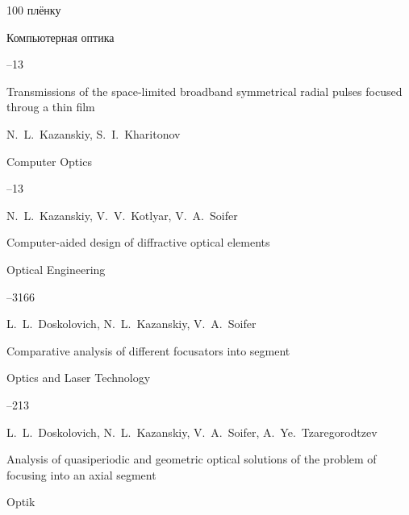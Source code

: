 \begin{thebibliography}{100}
плёнку 

\jour Компьютерная оптика




--13

\misctransl

\paper Transmissions of the space-limited broadband symmetrical radial pulses focused throug a thin film

\by N.~L.~Kazanskiy, S.~I.~Kharitonov

\jour Computer Optics




--13








\by N.~L.~Kazanskiy, V.~V.~Kotlyar, V.~A.~Soifer

\paper Computer-aided design of diffractive optical elements

\jour Optical Engineering




--3166




\by L.~L.~Doskolovich, N.~L.~Kazanskiy, V.~A.~Soifer

\paper Comparative analysis of different focusators into segment

\jour  Optics and Laser Technology




--213




\by L.~L.~Doskolovich, N.~L.~Kazanskiy, V.~A.~Soifer, A.~Ye.~Tzaregorodtzev

\paper Analysis of quasiperiodic and geometric optical solutions of the problem of focusing into an axial segment

\jour Optik




\end{thebibliography}
